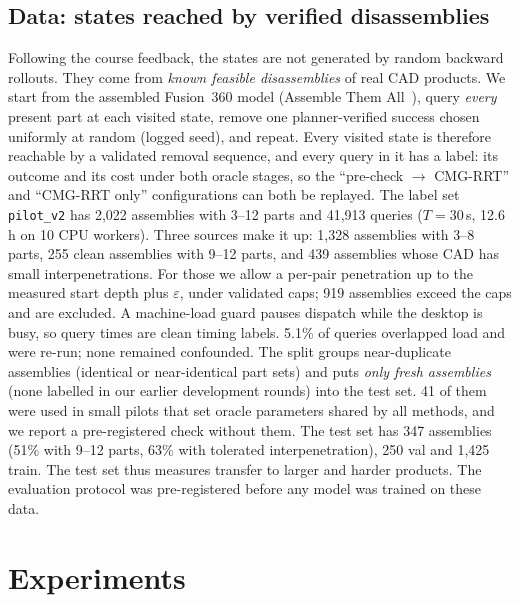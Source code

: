\documentclass[conference]{IEEEtran}
\begin{document}
\subsection{Data: states reached by verified disassemblies}
Following the course feedback, the states are not generated by random backward rollouts. They come from
\emph{known feasible disassemblies} of real CAD products. We start from the assembled Fusion~360 model (Assemble Them
All~\cite{tian2022ata}), query \emph{every} present part at each visited state, remove one planner-verified success
chosen uniformly at random (logged seed), and repeat. Every visited state is therefore reachable by a validated
removal sequence, and every query in it has a label: its outcome and its cost under both oracle stages, so the
``pre-check $\rightarrow$ CMG-RRT'' and ``CMG-RRT only'' configurations can both be replayed.
The label set \texttt{pilot\_v2} has 2{,}022 assemblies with 3--12 parts and 41{,}913 queries ($T=30$\,s, 12.6\,h on 10
CPU workers). Three sources make it up: 1{,}328 assemblies with 3--8 parts, 255 clean assemblies with 9--12 parts,
and 439 assemblies whose CAD has small interpenetrations. For those we allow a per-pair penetration up to the
measured start depth plus $\varepsilon$, under validated caps; 919 assemblies exceed the caps and are excluded.
A machine-load guard pauses dispatch while the desktop is busy, so query times are clean timing labels. 5.1\% of
queries overlapped load and were re-run; none remained confounded.
The split groups near-duplicate assemblies (identical or near-identical part sets) and puts \emph{only fresh
assemblies} (none labelled in our earlier development rounds) into the test set. 41 of them were used in small pilots
that set oracle parameters shared by all methods, and we report a pre-registered check without them. The test set has 347 assemblies (51\% with 9--12 parts, 63\% with
tolerated interpenetration), 250 val and 1{,}425 train. The test set thus measures transfer to larger and harder
products. The evaluation protocol was pre-registered before any model was trained on these data.

\section{Experiments}
\label{sec:exp}
\end{document}
